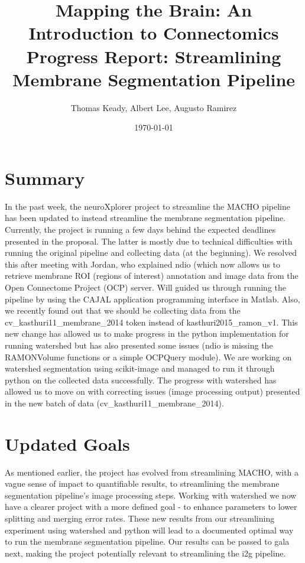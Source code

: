 \documentclass[11pt]{article}
\title{Mapping the Brain: An Introduction to Connectomics\\Progress Report: Streamlining Membrane Segmentation Pipeline}
\author{Thomas Keady, Albert Lee, Augusto Ramirez}
\date{\today}
\begin{document}
\maketitle

\section{Summary}

In the past week, the neuroXplorer project to streamline the MACHO pipeline has been updated to instead streamline the membrane segmentation pipeline. Currently, the project is running a few days behind the expected deadlines presented in the proposal. The latter is mostly due to technical difficulties with running the original pipeline and collecting data (at the beginning). We resolved this after meeting with Jordan, who explained ndio (which now allows us to retrieve membrane ROI (regions of interest) annotation and image data from the Open Connectome Project (OCP) server. Will guided us through running the pipeline by using the CAJAL application programming interface in Matlab. Also, we recently found out that we should be collecting data from the cv\_kasthuri11\_membrane\_2014 token instead of kasthuri2015\_ramon\_v1. This new change has allowed us to make progress in the python implementation for running watershed but has also presented some issues (ndio is missing the RAMONVolume functions or a simple OCPQuery module). We are working on watershed segmentation using scikit-image and managed to run it through python on the collected data successfully. The progress with watershed has allowed us to move on with correcting issues (image processing output) presented in the new batch of data (cv\_kasthuri11\_membrane\_2014).

\section{Updated Goals}

As mentioned earlier, the project has evolved from streamlining MACHO, with a vague sense of impact to quantifiable results, to streamlining the membrane segmentation pipeline's image processing steps. Working with watershed we now have a clearer project with a more defined goal - to enhance parameters to lower splitting and merging error rates. These new results from our streamlining experiment using watershed and python will lead to a documented optimal way to run the membrane segmentation pipeline. Our results can be passed to gala next, making the project potentially relevant to streamlining the i2g pipeline.
\end{document}
